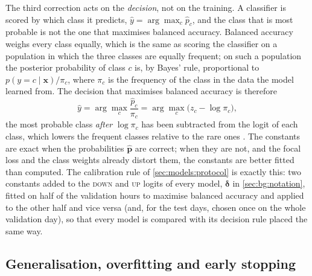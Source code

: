 The third correction acts on the \emph{decision}, not on the training.  A classifier is
scored by which class it predicts, $\hat{y} = \arg\max_c \hat{p}_c$, and the class that is
most probable is not the one that maximises balanced accuracy.  Balanced accuracy weighs
every class equally, which is the same as scoring the classifier on a population in which
the three classes are equally frequent; on such a population the posterior probability of
class $c$ is, by Bayes' rule, proportional to $p(y = c \mid \mathbf{x}) / \pi_c$, where
$\pi_c$ is the frequency of the class in the data the model learned from.  The decision
that maximises balanced accuracy is therefore
\begin{equation}
  \hat{y} = \arg\max_c \frac{\hat{p}_c}{\pi_c} = \arg\max_c \bigl( z_c - \log \pi_c \bigr),
  \label{eq:logit-adjustment}
\end{equation}
the most probable class \emph{after} $\log \pi_c$ has been subtracted from the logit of
each class, which lowers the frequent classes relative to the rare ones
\cite{menon2021logitadjustment}.  The constants are
exact when the probabilities $\hat{\mathbf{p}}$ are correct; when they are not, and the
focal loss and the class weights already distort them, the constants are better fitted than
computed.  The calibration rule of \cref{sec:models:protocol} is exactly this: two
constants added to the \textsc{down} and \textsc{up} logits of every model,
$\boldsymbol{\delta}$ in \cref{sec:bg:notation}, fitted on half of the validation hours to
maximise balanced accuracy and applied to the other half and vice versa (and, for the test
days, chosen once on the whole validation day), so that every model is compared with its
decision rule placed the same way.

\subsection{Generalisation, overfitting and early stopping}
\label{sec:bg:learning:generalisation}

